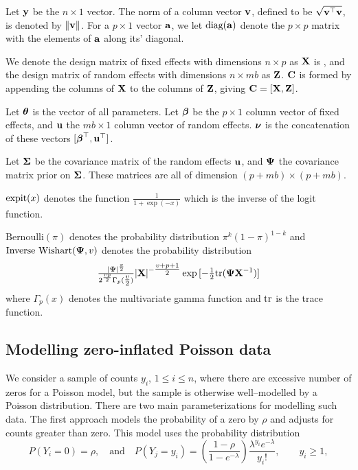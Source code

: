 \documentclass{amsart}[12pt]
\begin{document}
Let ${\bf y}$ be the $n \times 1$ vector. The norm of a column vector ${\bf v}$, defined to be $\sqrt{{\bf v}^\top {\bf v}}$,
is  denoted by $\|{\bf v}\|$. For a $p \times 1$ vector ${\bf a}$, we let $\text{diag}{({\bf a})}$ denote the $p \times p$
matrix with the elements of ${\bf a}$ along its' diagonal.

We denote the design matrix of fixed effects with
dimensions $n \times p$ as ${\bf X}$ is , and the design matrix of random  effects with dimensions $n \times m b$
as ${\bf Z}$.  ${\bf C}$ is formed by appending the columns of ${\bf X}$ to the columns of ${\bf Z}$, giving ${\bf C} = [ {\bf X}, {\bf Z}
]$.

Let ${\boldsymbol \theta}$ is the vector of all parameters.
Let ${\boldsymbol \beta}$ be the $p \times 1$ column vector of fixed
effects, and ${\bf u}$ the $m b \times 1$ column vector of random effects. ${\boldsymbol \nu}$ is the
concatenation of these vectors $[{\boldsymbol \beta}^\top, {\bf u}^\top]$.

Let ${\boldsymbol \Sigma}$ be the covariance matrix of the random effects ${\bf u}$,
and 
${\boldsymbol \Psi}$ the covariance matrix prior on ${\boldsymbol \Sigma}$.
These matrices are all of dimension $(p + m b) \times (p + m b)$.


\noindent $\text{expit} (x)$ denotes the function $\tfrac{1}{1 + \exp(-x)}$ which is the inverse of the logit
function.

\noindent $\text{Bernoulli}(\pi)$ denotes the probability distribution $\pi^k (1 - \pi)^{1-k}$ and
$\text{Inverse Wishart}({\boldsymbol \Psi}, v)$ denotes the probability distribution
$$\tfrac{|{\boldsymbol \Psi}|^\frac{v}{2}}{2^{\frac{vp}{2}} \Gamma_p{(\tfrac{v}{2})}} |{\bf X}|^{-\tfrac{v + p + 1}{2}}
\exp{[- \tfrac{1}{2} \text{tr}{({\boldsymbol\Psi}{\bf X}^{-1})}]}$$ where $\Gamma_p{(x)}$ denotes the multivariate gamma function and $\text{tr}$
is the trace function.

\subsection{Modelling zero-inflated Poisson data}

We consider a sample of counts $y_i$, $1 \le i\le n$, where there are excessive number of zeros for a Poisson
model, but the sample is otherwise well--modelled by a Poisson distribution. There are two main
parameterizations for modelling such data. The first approach models the probability of a zero by $\rho$ and
adjusts for counts greater than zero. This model uses the probability distribution
\[
	P(Y_i = 0) = \rho, 
	\quad \mbox{and} \quad 
	P(Y_j = y_i) = \left( \frac{1 - \rho}{1 - e^{-\lambda}} \right) \frac{\lambda^{y_i} e^{-\lambda}} {y_i!},\qquad y_i \ge 1,
\]
\end{document}
